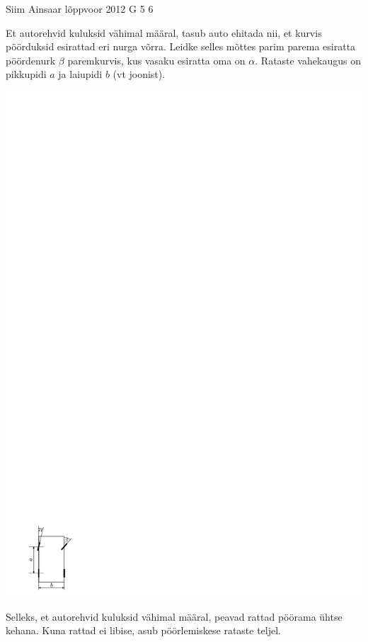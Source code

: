 {Siim Ainsaar} %
{lõppvoor} %
{2012} %
{G 5} %
{6} %
{
\ifStatement
Et autorehvid kuluksid vähimal määral, tasub auto ehitada nii, et kurvis
pöörduksid esirattad eri nurga võrra. Leidke selles mõttes parim parema
esiratta pöördenurk $\beta$ paremkurvis, kus
vasaku esiratta oma on $\alpha$. Rataste vahekaugus on pikkupidi $a$ ja laiupidi
$b$ (vt joonist).
\begin{center}
\includegraphics[width=0.3\linewidth]{2012-v3g-05-r_yl_joonis}%
\end{center}
\fi


\ifHint
Selleks, et autorehvid kuluksid vähimal määral, peavad rattad pöörama ühtse kehana. Kuna rattad ei libise, asub pöörlemiskese rataste teljel.
\fi


}
